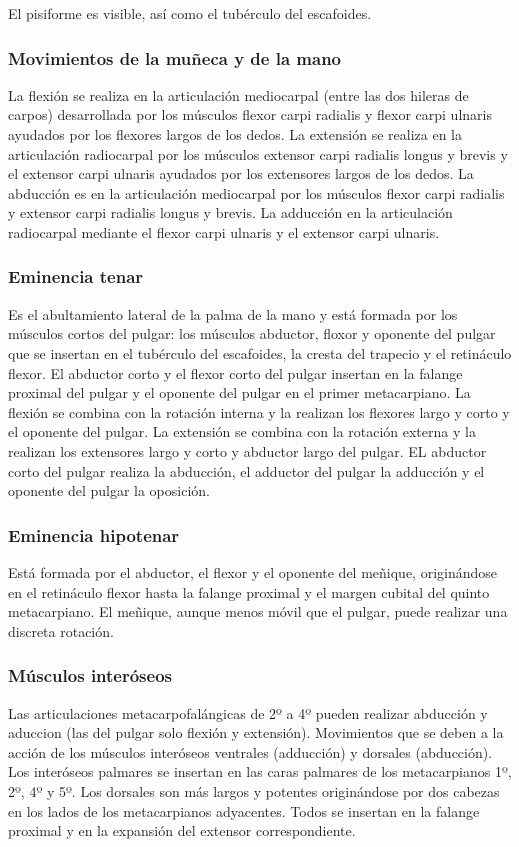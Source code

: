 El pisiforme es visible, así como el tubérculo del escafoides.


\subsubsection{Movimientos de la muñeca y de la mano}
La flexión se realiza en la articulación mediocarpal (entre las dos hileras de carpos) desarrollada por los músculos flexor carpi radialis y flexor carpi ulnaris ayudados por los flexores largos de los dedos. La extensión se realiza en la articulación radiocarpal por los músculos extensor carpi radialis longus y brevis y el extensor carpi ulnaris ayudados por los extensores largos de los dedos. La abducción es en la articulación mediocarpal por los músculos flexor carpi radialis y extensor carpi radialis longus y brevis. La adducción en la articulación radiocarpal mediante el flexor carpi ulnaris y el extensor carpi ulnaris.

\subsubsection{Eminencia tenar}
Es el abultamiento lateral de la palma de la mano y está formada por los músculos cortos del pulgar: los músculos abductor, floxor y oponente del pulgar que se insertan en el tubérculo del escafoides, la cresta del trapecio y el retináculo flexor. El abductor corto y el flexor corto del pulgar insertan en la falange proximal del pulgar y el oponente del pulgar en el primer metacarpiano.
La flexión se combina con la rotación interna y la realizan los flexores largo y corto y el oponente del pulgar. La extensión se combina con la rotación externa y la realizan los extensores largo y corto y abductor largo del pulgar. EL abductor corto del pulgar realiza la abducción, el adductor del pulgar la adducción y el oponente del pulgar la oposición.

\subsubsection{Eminencia hipotenar}
Está formada por el abductor, el flexor y el oponente del meñique, originándose en el retináculo flexor hasta la falange proximal y el margen cubital del quinto metacarpiano. El meñique, aunque menos móvil que el pulgar, puede realizar una discreta rotación.

\subsubsection{Músculos interóseos}
Las articulaciones metacarpofalángicas de 2º a 4º pueden realizar abducción y aduccion (las del pulgar solo flexión y extensión). Movimientos que se deben a la acción de los músculos interóseos ventrales (adducción) y dorsales (abducción). Los interóseos palmares se insertan en las caras palmares de los metacarpianos 1º, 2º, 4º y 5º. Los dorsales son más largos y potentes originándose por dos cabezas en los lados de los metacarpianos adyacentes. Todos se insertan en la falange proximal y en la expansión del extensor correspondiente.

